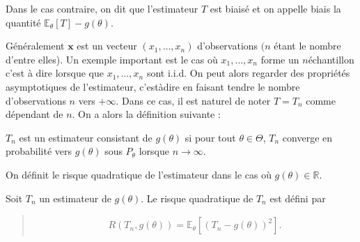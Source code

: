 \documentclass[letterpaper,11pt,english]{sphinxmanual}
\begin{document}
\sphinxAtStartPar
Dans le cas contraire, on dit que l’estimateur \(T\) est biaisé et
on appelle biais la quantité \(\mathbb{E}_{\theta}[T] - g(\theta)\).

\sphinxAtStartPar
Généralement \(\mathbf{x}\) est un vecteur
\(\left(x_{1}, \ldots, x_{n}\right)\) d’observations \((n\)
étant le nombre d’entre elles). Un exemple important est le cas où
\(x_{1},\ldots, x_{n}\) forme un \(n\)\sphinxhyphen{}échantillon c’est à dire
lorsque que \(x_{1}, \ldots, x_{n}\) sont i.i.d. On peut alors
regarder des propriétés asymptotiques de l’estimateur, c’est\sphinxhyphen{}à\sphinxhyphen{}dire en
faisant tendre le nombre d’observations \(n\) vers \(+\infty\).
Dans ce cas, il est naturel de noter \(T = T_n\) comme dépendant de
\(n\). On a alors la définition suivante :

\sphinxAtStartPar
{}

\sphinxAtStartPar
\(T_n\) est un estimateur consistant de \(g(\theta)\) si pour
tout \(\theta \in \Theta\), \(T_n\) converge en probabilité vers
\(g(\theta)\) sous \(P_{\theta}\) lorsque \(n\to\infty\).

\begin{DUlineblock}{0em}
\item[] On définit le risque quadratique de l’estimateur dans le cas où
\(g(\theta)\in\mathbb{R}\).
\item[] 
\item[] Soit \(T_n\) un estimateur de \(g(\theta)\). Le risque
quadratique de \(T_n\) est défini par
\end{DUlineblock}
\begin{quote}
\begin{equation}\label{equation:chapter2:chapter2:63}
\begin{split}R(T_n,g(\theta)) = \mathbb{E}_{\theta}[(T_n - g(\theta))^2].\end{split}
\end{equation}\end{quote}
\end{document}
